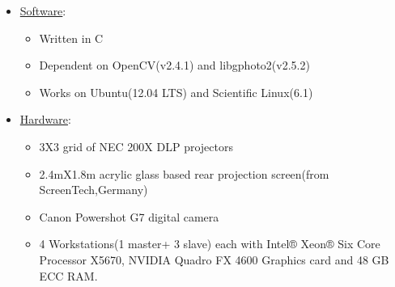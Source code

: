 \documentclass{beamer}
\begin{document}
\begin{frame}[label=sysconfg]
\begin{itemize}
\item \underline{Software}:
\begin{itemize}
\item Written in C
\item Dependent on OpenCV(v2.4.1) and libgphoto2(v2.5.2)
\item Works on Ubuntu(12.04 LTS) and Scientific Linux(6.1)
\end{itemize}      
\item \underline{Hardware}:
\begin{itemize}
\item 3X3 grid of NEC 200X DLP projectors
\item 2.4mX1.8m acrylic glass based rear projection screen(from ScreenTech,Germany)
\item Canon Powershot G7 digital camera
\item 4 Workstations(1 master+ 3 slave) each with Intel® Xeon® Six Core Processor X5670, NVIDIA Quadro FX 4600 Graphics card and 48 GB ECC RAM.
\end{itemize}
\end{itemize}
\end{frame}

\end{document}
